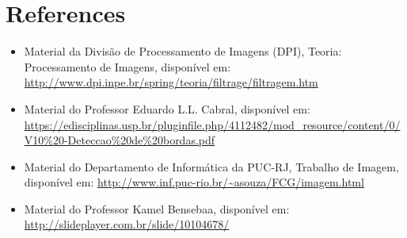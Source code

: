 \documentclass{article}
\begin{document}
\section{References}
\small
\begin{itemize}
    \item Material da Divisão de Processamento de Imagens (DPI), Teoria: Processamento de Imagens, disponível em: \url{http://www.dpi.inpe.br/spring/teoria/filtrage/filtragem.htm}
    \item Material do Professor Eduardo L.L. Cabral, disponível em: \url{https://edisciplinas.usp.br/pluginfile.php/4112482/mod_resource/content/0/V10%20-Deteccao%20de%20bordas.pdf}
    \item Material do Departamento de Informática da PUC-RJ, Trabalho de Imagem, disponível em: \url{http://www.inf.puc-rio.br/~asouza/FCG/imagem.html}
    \item Material do Professor Kamel Bensebaa, disponível em: \url{http://slideplayer.com.br/slide/10104678/}
\end{itemize}
\end{document}
